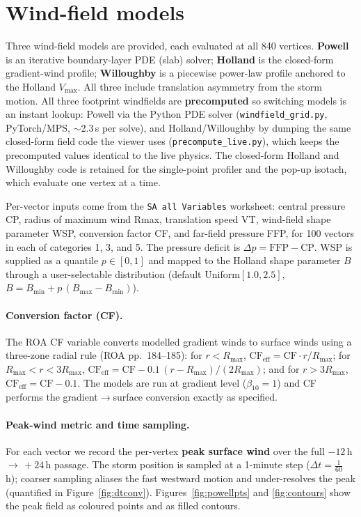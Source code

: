\documentclass[11pt]{article}
\begin{document}
\section{Wind-field models}
Three wind-field models are provided, each evaluated at all 840 vertices.
\textbf{Powell} is an iterative boundary-layer PDE (slab) solver;
\textbf{Holland} is the closed-form gradient-wind profile; \textbf{Willoughby}
is a piecewise power-law profile anchored to the Holland $V_{\max}$. All three
include translation asymmetry from the storm motion. All three footprint
windfields are \textbf{precomputed} so switching models is an instant lookup:
Powell via the Python PDE solver (\texttt{windfield\_grid.py}, PyTorch/MPS,
$\sim$2.3\,s per solve), and Holland/Willoughby by dumping the same closed-form
field code the viewer uses (\texttt{precompute\_live.py}), which keeps the
precomputed values identical to the live physics. The closed-form Holland and
Willoughby code is retained for the single-point profiler and the pop-up isotach,
which evaluate one vertex at a time.

Per-vector inputs come from the \texttt{SA all Variables} worksheet: central
pressure CP, radius of maximum wind Rmax, translation speed VT, wind-field shape
parameter WSP, conversion factor CF, and far-field pressure FFP, for 100 vectors
in each of categories 1, 3, and 5. The pressure deficit is $\Delta p=\text{FFP}-\text{CP}$.
WSP is supplied as a quantile $p\in[0,1]$ and mapped to the Holland shape
parameter $B$ through a user-selectable distribution (default Uniform$[1.0,2.5]$,
$B=B_{\min}+p\,(B_{\max}-B_{\min})$).

\paragraph{Conversion factor (CF).}
The ROA CF variable converts modelled gradient winds to surface winds using a
three-zone radial rule (ROA pp.~184--185): for $r<R_{\max}$,
$\text{CF}_{\text{eff}}=\text{CF}\cdot r/R_{\max}$; for
$R_{\max}\!<\!r\!<\!3R_{\max}$, $\text{CF}_{\text{eff}}=\text{CF}-0.1\,(r-R_{\max})/(2R_{\max})$;
and for $r>3R_{\max}$, $\text{CF}_{\text{eff}}=\text{CF}-0.1$. The models are run
at gradient level ($\beta_{10}=1$) and CF performs the gradient$\to$surface
conversion exactly as specified.

\paragraph{Peak-wind metric and time sampling.}
For each vector we record the per-vertex \textbf{peak surface wind} over the full
$-12$\,h\,$\to\,+24$\,h passage. The storm position is sampled at a 1-minute step
($\Delta t=\tfrac{1}{60}$\,h); coarser sampling aliases the fast westward motion
and under-resolves the peak (quantified in Figure~\ref{fig:dtconv}).
Figures~\ref{fig:powellpts} and \ref{fig:contours} show the peak field as coloured
points and as filled contours.
\end{document}
